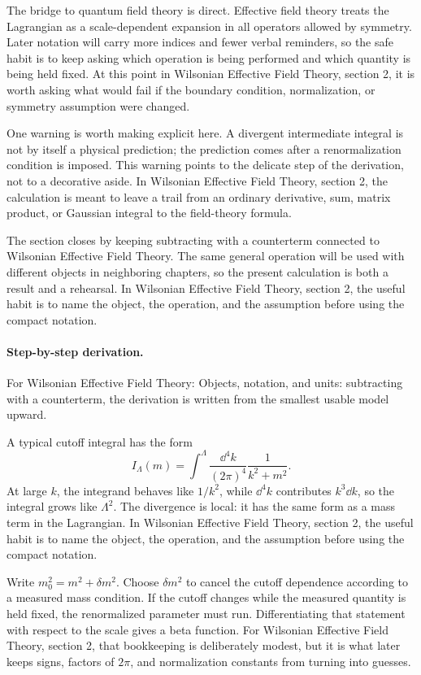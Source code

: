 The bridge to quantum field theory is direct.  Effective field theory treats the Lagrangian as a scale-dependent expansion in all operators allowed by symmetry.  Later notation will carry more indices and fewer verbal reminders, so the safe habit is to keep asking which operation is being performed and which quantity is being held fixed.  At this point in Wilsonian Effective Field Theory, section 2, it is worth asking what would fail if the boundary condition, normalization, or symmetry assumption were changed.

One warning is worth making explicit here.  A divergent intermediate integral is not by itself a physical prediction; the prediction comes after a renormalization condition is imposed.  This warning points to the delicate step of the derivation, not to a decorative aside.  In Wilsonian Effective Field Theory, section 2, the calculation is meant to leave a trail from an ordinary derivative, sum, matrix product, or Gaussian integral to the field-theory formula.

The section closes by keeping subtracting with a counterterm connected to Wilsonian Effective Field Theory.  The same general operation will be used with different objects in neighboring chapters, so the present calculation is both a result and a rehearsal.  In Wilsonian Effective Field Theory, section 2, the useful habit is to name the object, the operation, and the assumption before using the compact notation.



\paragraph{Step-by-step derivation.}

For Wilsonian Effective Field Theory: Objects, notation, and units: subtracting with a counterterm, the derivation is written from the smallest usable model upward.

A typical cutoff integral has the form
\[
  I_\Lambda(m)=\int^{\Lambda}\frac{\dd^4k}{(2\pi)^4}\frac{1}{k^2+m^2}.
\]
At large \(k\), the integrand behaves like \(1/k^2\), while \(\dd^4k\) contributes \(k^3\dd k\), so the integral grows like \(\Lambda^2\).  The divergence is local: it has the same form as a mass term in the Lagrangian.  In Wilsonian Effective Field Theory, section 2, the useful habit is to name the object, the operation, and the assumption before using the compact notation.

Write \(m_0^2=m^2+\delta m^2\).  Choose \(\delta m^2\) to cancel the cutoff dependence according to a measured mass condition.  If the cutoff changes while the measured quantity is held fixed, the renormalized parameter must run.  Differentiating that statement with respect to the scale gives a beta function.  For Wilsonian Effective Field Theory, section 2, that bookkeeping is deliberately modest, but it is what later keeps signs, factors of \(2\pi\), and normalization constants from turning into guesses.

